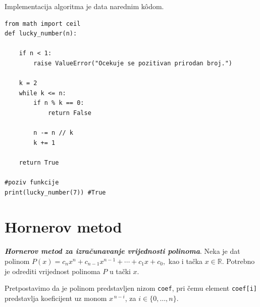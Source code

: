  
 Implementacija algoritma je data narednim k\^odom. 
 
 \begin{verbatim}
from math import ceil
def lucky_number(n):

    if n < 1:
        raise ValueError("Ocekuje se pozitivan prirodan broj.")

    k = 2
    while k <= n:
        if n % k == 0:
            return False

        n -= n // k
        k += 1

    return True   

#poziv funkcije
print(lucky_number(7)) #True
\end{verbatim}
  
 
 
 \section{Hornerov metod}
 
 \begin{definition}
 	\textbf{\textit{Hornerov metod za izračunavanje vrijednosti polinoma}}. Neka je dat polinom 
 	$P(x)=c_nx^n+c_{n-1}x^{n-1}+\cdots+c_1x+c_0,$ 
 	kao i tačka $x\in\mathbb{R}$. Potrebno je odrediti vrijednost polinoma $P$ u tački $x$. 
 	
 	Pretpostavimo da je polinom predstavljen nizom \texttt{coef}, pri čemu element \texttt{coef[i]} predstavlja koeficijent uz monom $x^{\,n-i}$, za $i\in\{0,\ldots,n\}$.
 	
 \end{definition}
 
